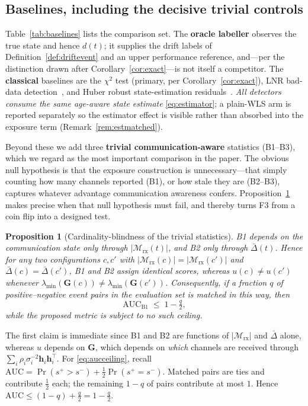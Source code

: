 \documentclass[journal]{IEEEtran}
\theoremstyle{plain}
\newtheorem{proposition}{Proposition}
\theoremstyle{definition}
\theoremstyle{remark}
\newcommand{\bh}{\mathbf{h}}
\newcommand{\bG}{\mathbf{G}}
\newcommand{\Mrx}{\mathcal{M}_{\mathrm{rx}}}
\newcommand{\lmin}{\lambda_{\min}}
\begin{document}
\subsection{Baselines, including the decisive trivial controls}
Table~\ref{tab:baselines} lists the comparison set. The \textbf{oracle
labeller} observes the true state and hence $d(t)$; it supplies the drift
labels of Definition~\ref{def:driftevent} and an upper performance
reference, and---per the distinction drawn after
Corollary~\ref{cor:exact}---is not itself a competitor. The
\textbf{classical} baselines are the $\chi^{2}$ test (primary,
per Corollary~\ref{cor:exact}), LNR bad-data
detection~\cite{abur2004,handschin1975}, and Huber robust
state-estimation residuals~\cite{gol2014lav,abur2004}. \emph{All detectors
consume the same age-aware state estimate} \eqref{eq:estimator}; a
plain-WLS arm is reported separately so the estimator effect is visible
rather than absorbed into the exposure term
(Remark~\ref{rem:estmatched}).

Beyond these we add three \textbf{trivial communication-aware} statistics
(B1--B3), which we regard as the most important comparison in the paper.
The obvious null hypothesis is that the exposure construction is
unnecessary---that simply counting how many channels reported (B1), or how
stale they are (B2--B3), captures whatever advantage communication
awareness confers. Proposition~\ref{prop:cardinality} makes precise when
that null hypothesis must fail, and thereby turns F3 from a coin flip into
a designed test.

\begin{proposition}[Cardinality-blindness of the trivial statistics]
\label{prop:cardinality}
B1 depends on the communication state only through $|\Mrx(t)|$, and B2
only through $\bar\Delta(t)$. Hence for any two configurations $c,c'$ with
$|\Mrx(c)|=|\Mrx(c')|$ and $\bar\Delta(c)=\bar\Delta(c')$, B1 and B2
assign \emph{identical} scores, whereas
$u(c)\neq u(c')$ whenever $\lmin(\bG(c))\neq\lmin(\bG(c'))$. Consequently,
if a fraction $q$ of positive--negative event pairs in the evaluation set
is matched in this way, then
\begin{equation}
\mathrm{AUC}_{\mathrm{B1}}\;\le\;1-\tfrac{q}{2},
\label{eq:aucceiling}
\end{equation}
while the proposed metric is subject to no such ceiling.
\end{proposition}
\begin{IEEEproof}
The first claim is immediate since B1 and B2 are functions of
$|\Mrx|$ and $\bar\Delta$ alone, whereas $u$ depends on $\bG$, which
depends on \emph{which} channels are received through
$\sum_i\rho_i\sigma_i^{-2}\bh_i\bh_i^{\top}$. For \eqref{eq:aucceiling},
recall $\mathrm{AUC}=\Pr(s^{+}>s^{-})+\tfrac12\Pr(s^{+}=s^{-})$. Matched
pairs are ties and contribute $\tfrac12$ each; the remaining $1-q$ of
pairs contribute at most $1$. Hence
$\mathrm{AUC}\le(1-q)+\tfrac{q}{2}=1-\tfrac{q}{2}$.
\end{IEEEproof}
\end{document}
